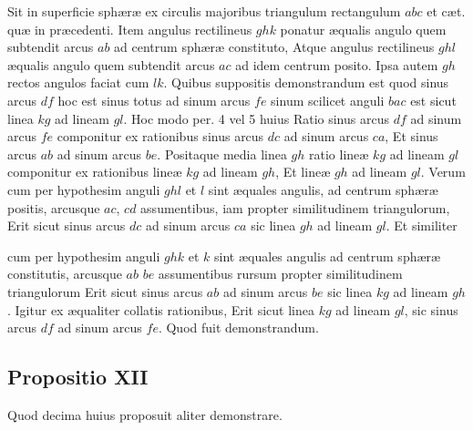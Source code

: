 \documentclass[11pt,a4paper]{article}
\begin{document}
Sit in superficie sphæræ ex circulis majoribus triangulum rectangulum $abc$ et cæt. quæ in præcedenti. Item angulus rectilineus $ghk$ ponatur æqualis angulo quem subtendit arcus $ab$ ad centrum sphæræ constituto, Atque angulus rectilineus $ghl$ æqualis angulo quem subtendit arcus $ac$ ad idem centrum posito. Ipsa autem $gh$ rectos angulos faciat cum $lk$. Quibus suppositis demonstrandum est quod sinus arcus $df$ hoc est sinus totus ad sinum arcus $fe$ sinum scilicet anguli $bac$ est sicut linea $kg$ ad lineam $gl$. Hoc modo per. 4 vel 5 huius Ratio sinus arcus $df$ ad sinum arcus $fe$ componitur ex rationibus sinus arcus $dc$ ad sinum arcus $ca$, Et sinus arcus $ab$ ad sinum arcus $be$. Positaque media linea $gh$ ratio lineæ $kg$ ad lineam $gl$ componitur ex rationibus lineæ $kg$ ad lineam $gh$, Et lineæ $gh$ ad lineam $gl$. Verum cum per hypothesim anguli $ghl$ et $l$ sint æquales angulis, ad centrum sphæræ positis, arcusque $ac$, $cd$ assumentibus, iam propter similitudinem triangulorum, Erit sicut sinus arcus $dc$ ad sinum arcus $ca$ sic linea $gh$ ad lineam $gl$. Et similiter

cum per hypothesim anguli $ghk$ et $k$ sint æquales angulis ad centrum sphæræ constitutis, arcusque $ab$ $be$ assumentibus rursum propter similitudinem triangulorum Erit sicut sinus arcus $ab$ ad sinum arcus $be$ sic  linea $kg$ ad lineam $gh$. Igitur ex æqualiter collatis rationibus, Erit sicut linea $kg$ ad lineam $gl$, sic sinus arcus $df$ ad sinum arcus $fe$. Quod fuit demonstrandum.

\subsection*{Propositio XII}

Quod decima huius proposuit aliter demonstrare.
\end{document}
